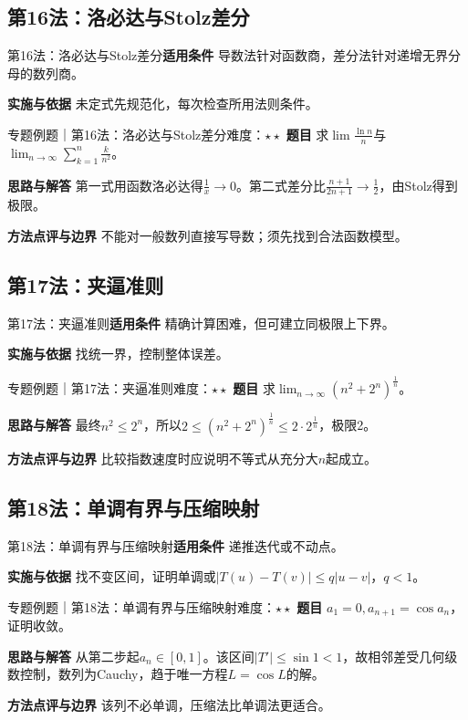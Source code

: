 \subsection{第16法：洛必达与Stolz差分}\label{mat:limits_35:k16}
\begin{method}{第16法：洛必达与Stolz差分}\textbf{适用条件} 导数法针对函数商，差分法针对递增无界分母的数列商。\par\textbf{实施与依据} 未定式先规范化，每次检查所用法则条件。\end{method}
\begin{example}{专题例题｜第16法：洛必达与Stolz差分}{难度：$\star\star$}
\textbf{题目} 求$\lim\frac{\ln n}{n}$与$\lim_{n\to\infty}\sum_{k=1}^n\frac{k}{n^2}$。\par\textbf{思路与解答} 第一式用函数洛必达得$\frac{1}{x}\to0$。第二式差分比$\frac{n+1}{2n+1}\to\frac{1}{2}$，由Stolz得到极限。\par\textbf{方法点评与边界} 不能对一般数列直接写导数；须先找到合法函数模型。
\end{example}
\subsection{第17法：夹逼准则}\label{mat:limits_35:k17}
\begin{method}{第17法：夹逼准则}\textbf{适用条件} 精确计算困难，但可建立同极限上下界。\par\textbf{实施与依据} 找统一界，控制整体误差。\end{method}
\begin{example}{专题例题｜第17法：夹逼准则}{难度：$\star\star$}
\textbf{题目} 求$\lim_{n\to\infty}(n^2+2^n)^{\frac{1}{n}}$。\par\textbf{思路与解答} 最终$n^2\le2^n$，所以$2\le(n^2+2^n)^{\frac{1}{n}}\le2\cdot2^{\frac{1}{n}}$，极限2。\par\textbf{方法点评与边界} 比较指数速度时应说明不等式从充分大$n$起成立。
\end{example}
\subsection{第18法：单调有界与压缩映射}\label{mat:limits_35:k18}
\begin{method}{第18法：单调有界与压缩映射}\textbf{适用条件} 递推迭代或不动点。\par\textbf{实施与依据} 找不变区间，证明单调或$|T(u)-T(v)|\le q|u-v|$，$q<1$。\end{method}
\begin{example}{专题例题｜第18法：单调有界与压缩映射}{难度：$\star\star$}
\textbf{题目} $a_1=0,a_{n+1}=\cos a_n$，证明收敛。\par\textbf{思路与解答} 从第二步起$a_n\in[0,1]$。该区间$|T\prime|\le\sin1<1$，故相邻差受几何级数控制，数列为Cauchy，趋于唯一方程$L=\cos L$的解。\par\textbf{方法点评与边界} 该列不必单调，压缩法比单调法更适合。
\end{example}
